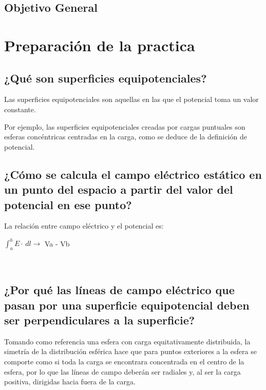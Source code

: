 \documentclass[letterpaper, 12pt]{report}
\begin{document}
\subsection{Objetivo General}

\section{Preparación de la practica}

\subsection{¿Qué son superficies equipotenciales?}
Las superficies equipotenciales son aquellas en las que el potencial toma un
valor constante.

Por ejemplo, las superficies equipotenciales creadas por
cargas puntuales son esferas concéntricas centradas en la carga, como se
deduce de la definición de potencial.\hfill\break{}~\cite{blas_fernández}

\subsection{¿Cómo se calcula el campo eléctrico estático en un punto del espacio a partir del valor del
	potencial en ese punto?}

La relación entre campo eléctrico y el potencial es:

$\int_{a}^{b} E \cdot\,dl \longrightarrow$ Va - Vb

~\cite{PotencialElectrico}

\subsection{¿Por qué las líneas de campo eléctrico que pasan por una superficie equipotencial deben ser
	perpendiculares a la superficie?}

Tomando como referencia una esfera con carga equitativamente distribuida,
la simetría de la distribución esférica hace que para puntos exteriores a
la esfera se comporte como si toda la carga se encontrara concentrada en
el centro de la esfera, por lo que las líneas de campo deberán ser radiales
y, al ser la carga positiva, dirigidas hacia fuera de la carga.

\vspace{.5cm}
\end{document}
